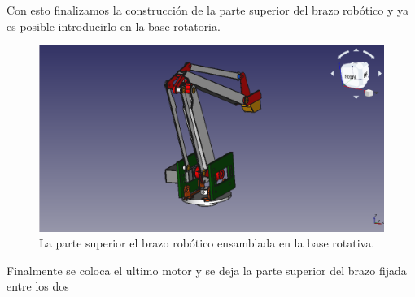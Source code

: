 Con esto finalizamos la construcción de la parte superior del brazo robótico y ya es posible introducirlo en la base rotatoria.

\begin{figure}[H]
    \centering 
    \includegraphics[width=1\linewidth]{pictures/ParteSuperiorDelBrazoEnElSoporte.png}
    \caption{La parte superior el brazo robótico ensamblada en la base rotativa.}
    \label{fig:parte_superio_ensamblada_base}
\end{figure}

Finalmente se coloca el ultimo motor y se deja la parte superior del brazo fijada entre los dos 




